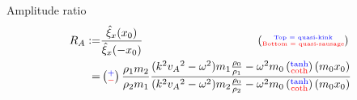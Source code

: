 \documentclass{beamer}
\begin{document}
\begin{frame}
\begin{figure}
\end{figure}
\vspace{-0.3cm}
\begin{block}{Amplitude ratio}
\vspace{-0.3cm}
\begin{align*}
R_A :=& \frac{\hat{\xi}_x(x_0)}{\hat{\xi}_x(-x_0)} \qquad \qquad \qquad \qquad \qquad \left(\substack{\text{\textcolor{blue}{\tiny Top = quasi-kink}} \\ \text{\tiny \textcolor{red}{Bottom = quasi-sausage}}}\right)\\
=&\left(\substack{\textcolor{blue}{+} \\ \textcolor{red}{-}}\right) \frac{\rho_1m_2}{\rho_2m_1}\frac{(k^2{v_A}^2-\omega^2)m_1\frac{\rho_0}{\rho_1}-\omega^2{m_0}\left(\substack{\textcolor{blue}{\tanh} \\ \textcolor{red}{\coth}}\right){({m_0}x_0)}}{(k^2{v_A}^2-\omega^2)m_2\frac{\rho_0}{\rho_2}-\omega^2{m_0}\left(\substack{\textcolor{blue}{\tanh} \\ \textcolor{red}{\coth}}\right){({m_0}x_0)}}
\end{align*}
\end{block}
\end{frame}
\end{document}
